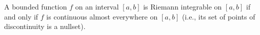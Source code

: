 A bounded function $f$ on an interval $[a,b]$ is Riemann integrable on $[a,b]$ if and only if $f$ is continuous almost everywhere on $[a,b]$ (i.e., its set of points of discontinuity is a nullset).
